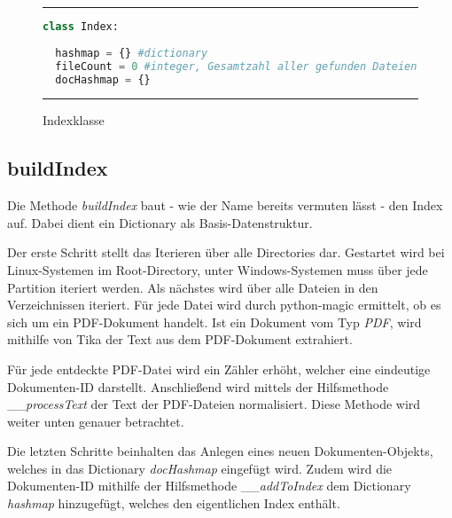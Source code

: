 \begin{figure}[h]
	\rule{\textwidth}{0.4pt}
		\begin{lstlisting}[language=Python]
class Index:
    
  hashmap = {} #dictionary
  fileCount = 0 #integer, Gesamtzahl aller gefunden Dateien
  docHashmap = {}
		\end{lstlisting}
	\rule{\textwidth}{0.4pt}
	\caption{Indexklasse}
	\label{fig:index}
\end{figure}

\subsection{buildIndex}\label{buildindex}

Die Methode \emph{buildIndex} baut - wie der Name bereits vermuten lässt - den Index auf. Dabei dient ein Dictionary als Basis-Datenstruktur.

Der erste Schritt stellt das Iterieren über alle Directories dar. Gestartet wird bei Linux-Systemen im Root-Directory, unter Windows-Systemen muss über jede Partition iteriert werden. Als nächstes wird über alle Dateien in den Verzeichnissen iteriert. Für jede Datei wird durch python-magic ermittelt, ob es sich um ein PDF-Dokument handelt. Ist ein Dokument vom Typ \emph{PDF}, wird mithilfe von Tika der Text aus dem PDF-Dokument extrahiert.

Für jede entdeckte PDF-Datei wird ein Zähler erhöht, welcher eine eindeutige Dokumenten-ID darstellt. Anschließend wird mittels der Hilfsmethode \_\_\emph{processText} der Text der PDF-Dateien normalisiert. Diese Methode wird weiter unten genauer betrachtet. 

Die letzten Schritte beinhalten das Anlegen eines neuen Dokumenten-Objekts, welches in das Dictionary \emph{docHashmap} eingefügt wird. Zudem wird die Dokumenten-ID mithilfe der Hilfsmethode \_\_\emph{addToIndex} dem Dictionary \emph{hashmap} hinzugefügt, welches den eigentlichen Index enthält.

